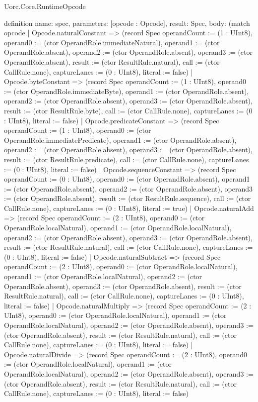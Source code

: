 \begin{lexlean}{Uorc.Core.RuntimeOpcode}
\begin{semanticmodule}
definition{
  name: spec,
  parameters: [opcode : Opcode],
  result: Spec,
  body: (match opcode
    | Opcode.naturalConstant => (record Spec {operandCount := (1 : UInt8), operand0 := (ctor OperandRole.immediateNatural), operand1 := (ctor OperandRole.absent), operand2 := (ctor OperandRole.absent), operand3 := (ctor OperandRole.absent), result := (ctor ResultRule.natural), call := (ctor CallRule.none), captureLanes := (0 : UInt8), literal := false})
    | Opcode.byteConstant => (record Spec {operandCount := (1 : UInt8), operand0 := (ctor OperandRole.immediateByte), operand1 := (ctor OperandRole.absent), operand2 := (ctor OperandRole.absent), operand3 := (ctor OperandRole.absent), result := (ctor ResultRule.byte), call := (ctor CallRule.none), captureLanes := (0 : UInt8), literal := false})
    | Opcode.predicateConstant => (record Spec {operandCount := (1 : UInt8), operand0 := (ctor OperandRole.immediatePredicate), operand1 := (ctor OperandRole.absent), operand2 := (ctor OperandRole.absent), operand3 := (ctor OperandRole.absent), result := (ctor ResultRule.predicate), call := (ctor CallRule.none), captureLanes := (0 : UInt8), literal := false})
    | Opcode.sequenceConstant => (record Spec {operandCount := (0 : UInt8), operand0 := (ctor OperandRole.absent), operand1 := (ctor OperandRole.absent), operand2 := (ctor OperandRole.absent), operand3 := (ctor OperandRole.absent), result := (ctor ResultRule.sequence), call := (ctor CallRule.none), captureLanes := (0 : UInt8), literal := true})
    | Opcode.naturalAdd => (record Spec {operandCount := (2 : UInt8), operand0 := (ctor OperandRole.localNatural), operand1 := (ctor OperandRole.localNatural), operand2 := (ctor OperandRole.absent), operand3 := (ctor OperandRole.absent), result := (ctor ResultRule.natural), call := (ctor CallRule.none), captureLanes := (0 : UInt8), literal := false})
    | Opcode.naturalSubtract => (record Spec {operandCount := (2 : UInt8), operand0 := (ctor OperandRole.localNatural), operand1 := (ctor OperandRole.localNatural), operand2 := (ctor OperandRole.absent), operand3 := (ctor OperandRole.absent), result := (ctor ResultRule.natural), call := (ctor CallRule.none), captureLanes := (0 : UInt8), literal := false})
    | Opcode.naturalMultiply => (record Spec {operandCount := (2 : UInt8), operand0 := (ctor OperandRole.localNatural), operand1 := (ctor OperandRole.localNatural), operand2 := (ctor OperandRole.absent), operand3 := (ctor OperandRole.absent), result := (ctor ResultRule.natural), call := (ctor CallRule.none), captureLanes := (0 : UInt8), literal := false})
    | Opcode.naturalDivide => (record Spec {operandCount := (2 : UInt8), operand0 := (ctor OperandRole.localNatural), operand1 := (ctor OperandRole.localNatural), operand2 := (ctor OperandRole.absent), operand3 := (ctor OperandRole.absent), result := (ctor ResultRule.natural), call := (ctor CallRule.none), captureLanes := (0 : UInt8), literal := false})
}
\end{semanticmodule}
\end{lexlean}
